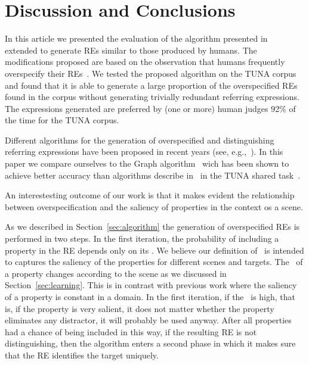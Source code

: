\section{Discussion and Conclusions} 
\label{sec:discussion}

In this article we presented the evaluation of the algorithm presented in~\cite{arec2:2008:Areces} extended to generate REs similar to those produced by humans. The modifications proposed are based on the observation that humans frequently overspecify their REs~\cite{Engelhardt_Bailey_Ferreira_2006,Arts_Maes_Noordman_Jansen_2011}. 
We tested the proposed algorithm on the TUNA corpus and found that it is able to generate a large proportion of the overspecified REs found in the corpus without generating trivially redundant referring expressions. The expressions generated are preferred by (one or more) human judges 92\% of the time for the TUNA corpus. 


Different algorithms for the generation of overspecified and distinguishing referring expressions have been proposed in recent years 
(see, e.g.,~\cite{delucena-paraboni:2008:ENLG,ruud-emiel-mariet:2012:INLG2012}). In this paper we compare ourselves to the Graph algorithm~\cite{KrahmerGRAPH} wich has been shown to achieve better accuracy than algorithms describe in~\cite{delucena-paraboni:2008:ENLG,ruud-emiel-mariet:2012:INLG2012} in the TUNA shared task~\cite{gatt-balz-kow:2008:ENLG}. 

An interestesting outcome of our work is that it makes evident the relationship between overspecification and the saliency of properties in the context os a scene.
 
 As we described in Section~\ref{sec:algorithm} the generation of overspecified REs is performed in two steps. In the first iteration, the probability of including a property in the RE depends only on its \puse. We believe our definition of \puse\ is intended to captures the saliency of the properties for different scenes and targets. The \puse\ of a property changes according to the scene as we discussed in Section~\ref{sec:learning}. This is in contrast with previous work where the saliency of a property is constant in a domain. In the first iteration, if the \puse~is high, that is, if the property is very salient, it does not matter whether the property eliminates any distractor, it will probably be used anyway. After all properties had a chance of being included in this way, if the resulting RE is not distinguishing, then the algorithm enters a second phase in which it makes sure that the RE identifies the target uniquely.  

